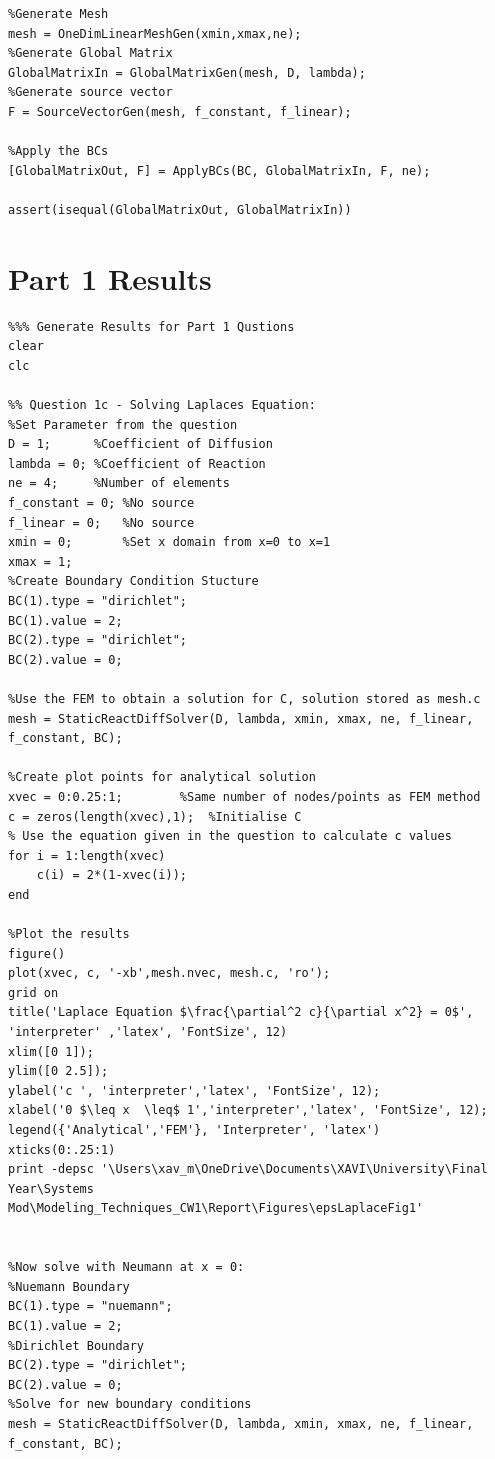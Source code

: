 \documentclass[11pt]{article}
\begin{document}
\begin{appendices}
\begin{lstlisting}
%Generate Mesh
mesh = OneDimLinearMeshGen(xmin,xmax,ne);
%Generate Global Matrix
GlobalMatrixIn = GlobalMatrixGen(mesh, D, lambda);
%Generate source vector
F = SourceVectorGen(mesh, f_constant, f_linear);

%Apply the BCs
[GlobalMatrixOut, F] = ApplyBCs(BC, GlobalMatrixIn, F, ne);

assert(isequal(GlobalMatrixOut, GlobalMatrixIn))

\end{lstlisting}

\clearpage
\section{Part 1 Results}\label{ap:results1}

\begin{lstlisting}
%%% Generate Results for Part 1 Qustions
clear
clc

%% Question 1c - Solving Laplaces Equation:
%Set Parameter from the question
D = 1;      %Coefficient of Diffusion
lambda = 0; %Coefficient of Reaction
ne = 4;     %Number of elements
f_constant = 0; %No source
f_linear = 0;   %No source
xmin = 0;       %Set x domain from x=0 to x=1
xmax = 1;
%Create Boundary Condition Stucture
BC(1).type = "dirichlet";
BC(1).value = 2;
BC(2).type = "dirichlet";
BC(2).value = 0;

%Use the FEM to obtain a solution for C, solution stored as mesh.c
mesh = StaticReactDiffSolver(D, lambda, xmin, xmax, ne, f_linear, f_constant, BC);

%Create plot points for analytical solution
xvec = 0:0.25:1;        %Same number of nodes/points as FEM method
c = zeros(length(xvec),1);  %Initialise C
% Use the equation given in the question to calculate c values
for i = 1:length(xvec)
    c(i) = 2*(1-xvec(i));
end

%Plot the results
figure()
plot(xvec, c, '-xb',mesh.nvec, mesh.c, 'ro');
grid on
title('Laplace Equation $\frac{\partial^2 c}{\partial x^2} = 0$', 'interpreter' ,'latex', 'FontSize', 12)
xlim([0 1]);
ylim([0 2.5]);
ylabel('c ', 'interpreter','latex', 'FontSize', 12);
xlabel('0 $\leq x  \leq$ 1','interpreter','latex', 'FontSize', 12);
legend({'Analytical','FEM'}, 'Interpreter', 'latex')
xticks(0:.25:1)
print -depsc '\Users\xav_m\OneDrive\Documents\XAVI\University\Final Year\Systems Mod\Modeling_Techniques_CW1\Report\Figures\epsLaplaceFig1'


%Now solve with Neumann at x = 0:
%Nuemann Boundary
BC(1).type = "nuemann";
BC(1).value = 2;
%Dirichlet Boundary
BC(2).type = "dirichlet";
BC(2).value = 0;
%Solve for new boundary conditions
mesh = StaticReactDiffSolver(D, lambda, xmin, xmax, ne, f_linear, f_constant, BC);


\end{lstlisting}
\end{appendices}
\end{document}
